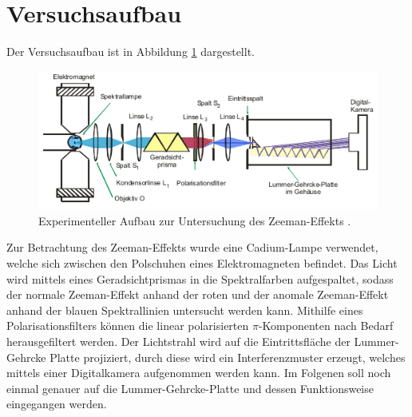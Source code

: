 \section{Versuchsaufbau}
Der Versuchsaufbau ist in Abbildung \ref{fig:tfig5} dargestellt.
\FloatBarrier
\begin{figure}
\centering
\includegraphics[width=\textwidth]{aufbau.png}
\caption{Experimenteller Aufbau zur Untersuchung des Zeeman-Effekts \cite{quelle02}.}
\label{fig:tfig5}
\end{figure}
\FloatBarrier
Zur Betrachtung des Zeeman-Effekts wurde eine Cadium-Lampe verwendet, welche sich zwischen den Polschuhen eines Elektromagneten befindet. 
Das Licht wird mittels eines Geradsichtprismas in die Spektralfarben aufgespaltet, sodass der normale
Zeeman-Effekt anhand der roten und der anomale Zeeman-Effekt anhand der blauen Spektrallinien untersucht werden kann. Mithilfe eines Polarisationsfilters können die linear polarisierten $\pi$-Komponenten
nach Bedarf herausgefiltert werden. Der Lichtstrahl wird auf die Eintrittsfläche der Lummer-Gehrcke Platte projiziert, durch diese wird ein Interferenzmuster erzeugt, 
welches mittels einer Digitalkamera aufgenommen werden kann. Im Folgenen soll noch einmal genauer auf die Lummer-Gehrcke-Platte und dessen Funktionsweise eingegangen werden.

